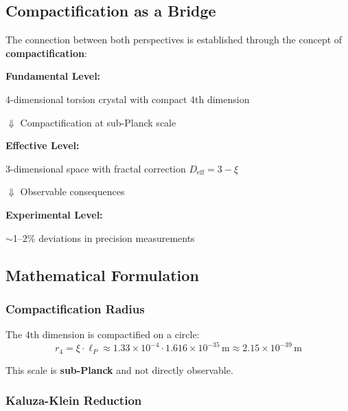 	\subsection{Compactification as a Bridge}
	
	The connection between both perspectives is established through the concept of \textbf{compactification}:
	
	\begin{keyresult}
		\textbf{Fundamental Level:}
		\begin{center}
			4-dimensional torsion crystal with compact 4th dimension
		\end{center}
		
		$\Downarrow$ \quad Compactification at sub-Planck scale
		
		\textbf{Effective Level:}
		\begin{center}
			3-dimensional space with fractal correction $D_{\text{eff}} = 3 - \xi$
		\end{center}
		
		$\Downarrow$ \quad Observable consequences
		
		\textbf{Experimental Level:}
		\begin{center}
			$\sim$1--2\% deviations in precision measurements
		\end{center}
	\end{keyresult}
	
	\subsection{Mathematical Formulation}
	
	\subsubsection{Compactification Radius}
	
	The 4th dimension is compactified on a circle:
	\begin{equation}
		\boxed{r_4 = \xi \cdot \ell_P \approx 1.33 \times 10^{-4} \cdot 1.616 \times 10^{-35}\,\text{m} \approx 2.15 \times 10^{-39}\,\text{m}}
	\end{equation}
	
	This scale is \textbf{sub-Planck} and not directly observable.
	
	\subsubsection{Kaluza-Klein Reduction}
	
